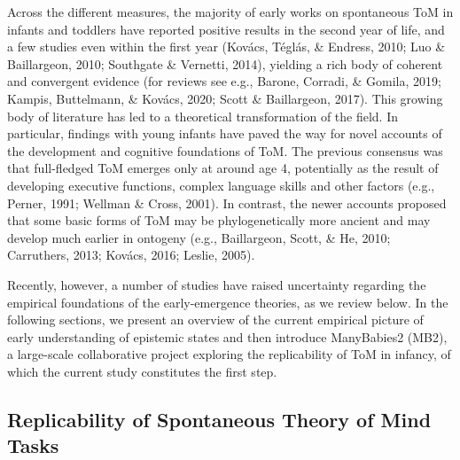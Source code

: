 \documentclass[
  man,floatsintext]{apa6}
\begin{document}
Across the different measures, the majority of early works on spontaneous ToM in infants and toddlers have reported positive results in the second year of life, and a few studies even within the first year (Kovács, Téglás, \& Endress, 2010; Luo \& Baillargeon, 2010; Southgate \& Vernetti, 2014), yielding a rich body of coherent and convergent evidence (for reviews see e.g., Barone, Corradi, \& Gomila, 2019; Kampis, Buttelmann, \& Kovács, 2020; Scott \& Baillargeon, 2017). This growing body of literature has led to a theoretical transformation of the field. In particular, findings with young infants have paved the way for novel accounts of the development and cognitive foundations of ToM. The previous consensus was that full-fledged ToM emerges only at around age 4, potentially as the result of developing executive functions, complex language skills and other factors (e.g., Perner, 1991; Wellman \& Cross, 2001). In contrast, the newer accounts proposed that some basic forms of ToM may be phylogenetically more ancient and may develop much earlier in ontogeny (e.g., Baillargeon, Scott, \& He, 2010; Carruthers, 2013; Kovács, 2016; Leslie, 2005).

Recently, however, a number of studies have raised uncertainty regarding the empirical foundations of the early-emergence theories, as we review below. In the following sections, we present an overview of the current empirical picture of early understanding of epistemic states and then introduce ManyBabies2 (MB2), a large-scale collaborative project exploring the replicability of ToM in infancy, of which the current study constitutes the first step.

\subsection{Replicability of Spontaneous Theory of Mind Tasks}\label{replicability-of-spontaneous-theory-of-mind-tasks}
\end{document}
